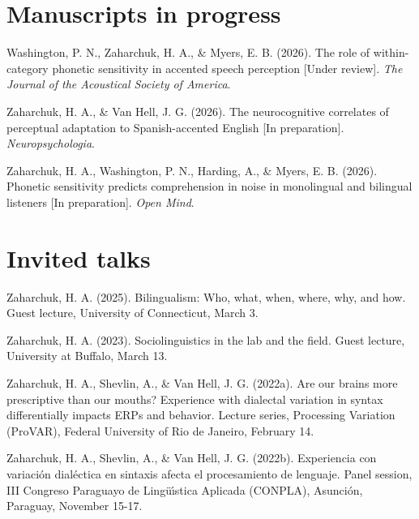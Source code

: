 \documentclass[11pt,a4paper,]{awesome-cv}
\newlength{\cslhangindent}
\newenvironment{CSLReferences}[2] %
 {\begin{list}{}{%
  \setlength{\itemindent}{0pt}
  \setlength{\leftmargin}{0pt}
  \setlength{\parsep}{0pt}
  \ifodd #1
   \setlength{\leftmargin}{\cslhangindent}
   \setlength{\itemindent}{-1\cslhangindent}
  \fi
  \setlength{\itemsep}{#2\baselineskip}}}
 {\end{list}}
\begin{document}
\section{Manuscripts in progress}\label{manuscripts-in-progress}

\label{refs-27e76f9df57632119f25d465e94ae168}
\begin{CSLReferences}{1}{0}
Washington, P. N., Zaharchuk, H. A., \& Myers, E. B. (2026). The role of
within-category phonetic sensitivity in accented speech perception
{[}Under review{]}. \emph{The Journal of the Acoustical Society of
America}.

Zaharchuk, H. A., \& Van Hell, J. G. (2026). The neurocognitive
correlates of perceptual adaptation to Spanish-accented English {[}In
preparation{]}. \emph{Neuropsychologia}.

Zaharchuk, H. A., Washington, P. N., Harding, A., \& Myers, E. B.
(2026). Phonetic sensitivity predicts comprehension in noise in
monolingual and bilingual listeners {[}In preparation{]}. \emph{Open
Mind}.

\end{CSLReferences}

\section{Invited talks}\label{invited-talks}

\label{refs-06ac7968e1e72a7b73a6c28c3943c4dd}
\begin{CSLReferences}{1}{0}
Zaharchuk, H. A. (2025). Bilingualism: Who, what, when, where, why, and
how. Guest lecture, University of Connecticut, March 3.

Zaharchuk, H. A. (2023). Sociolinguistics in the lab and the field.
Guest lecture, University at Buffalo, March 13.

Zaharchuk, H. A., Shevlin, A., \& Van Hell, J. G. (2022a). Are our
brains more prescriptive than our mouths? Experience with dialectal
variation in syntax differentially impacts ERPs and behavior. Lecture
series, Processing Variation (ProVAR), Federal University of Rio de
Janeiro, February 14.

Zaharchuk, H. A., Shevlin, A., \& Van Hell, J. G. (2022b). Experiencia
con variación dialéctica en sintaxis afecta el procesamiento de
lenguaje. Panel session, III Congreso Paraguayo de Lingüı́stica Aplicada
(CONPLA), Asunción, Paraguay, November 15-17.

\end{CSLReferences}
\end{document}
